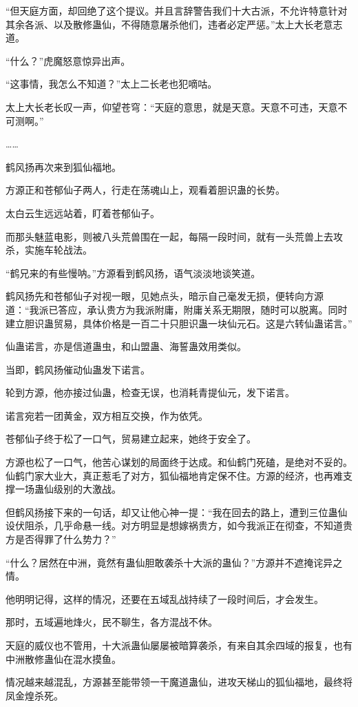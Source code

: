 \begin{this_body}
“但天庭方面，却回绝了这个提议。并且言辞警告我们十大古派，不允许特意针对其余各派、以及散修蛊仙，不得随意屠杀他们，违者必定严惩。”太上大长老意志道。

“什么？”虎魔怒意惊异出声。

“这事情，我怎么不知道？”太上二长老也犯嘀咕。

太上大长老长叹一声，仰望苍穹：“天庭的意思，就是天意。天意不可违，天意不可测啊。”

……

鹤风扬再次来到狐仙福地。

方源正和苍郁仙子两人，行走在荡魂山上，观看着胆识蛊的长势。

太白云生远远站着，盯着苍郁仙子。

而那头魅蓝电影，则被八头荒兽围在一起，每隔一段时间，就有一头荒兽上去攻杀，实施车轮战法。

“鹤兄来的有些慢呐。”方源看到鹤风扬，语气淡淡地谈笑道。

鹤风扬先和苍郁仙子对视一眼，见她点头，暗示自己毫发无损，便转向方源道：“我派已答应，承认贵方为我派附庸，附庸关系无期限，随时可以脱离。同时建立胆识蛊贸易，具体价格是一百二十只胆识蛊一块仙元石。这是六转仙蛊诺言。”

仙蛊诺言，亦是信道蛊虫，和山盟蛊、海誓蛊效用类似。

当即，鹤风扬催动仙蛊发下诺言。

轮到方源，他亦接过仙蛊，检查无误，也消耗青提仙元，发下诺言。

诺言宛若一团黄金，双方相互交换，作为依凭。

苍郁仙子终于松了一口气，贸易建立起来，她终于安全了。

方源也松了一口气，他苦心谋划的局面终于达成。和仙鹤门死磕，是绝对不妥的。仙鹤门家大业大，真正惹毛了对方，狐仙福地肯定保不住。方源的经济，也再难支撑一场蛊仙级别的大激战。

但鹤风扬接下来的一句话，却又让他心神一提：“我在回去的路上，遭到三位蛊仙设伏阻杀，几乎命悬一线。对方明显是想嫁祸贵方，如今我派正在彻查，不知道贵方是否得罪了什么势力？”

“什么？居然在中洲，竟然有蛊仙胆敢袭杀十大派的蛊仙？”方源并不遮掩诧异之情。

他明明记得，这样的情况，还要在五域乱战持续了一段时间后，才会发生。

那时，五域遍地烽火，民不聊生，各方混战不休。

天庭的威仪也不管用，十大派蛊仙屡屡被暗算袭杀，有来自其余四域的报复，也有中洲散修蛊仙在混水摸鱼。

情况越来越混乱，方源甚至能带领一干魔道蛊仙，进攻天梯山的狐仙福地，最终将凤金煌杀死。


\end{this_body}
